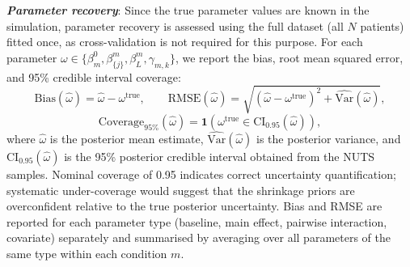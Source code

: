 \documentclass[12pt]{article}
\begin{document}
\noindent\textbf{\textit{Parameter recovery}}: Since the true parameter values are known in the simulation, parameter recovery is assessed using the full dataset (all $N$ patients) fitted once, as cross-validation is not required for this purpose. For each parameter $\omega \in \{\beta^0_m, \beta^m_{\{j\}}, \beta^m_L, \gamma_{m,k}\}$, we report the bias, root mean squared error, and 95\% credible interval coverage:
\[
\mathrm{Bias}(\hat{\omega}) = \hat{\omega} - \omega^{\mathrm{true}}, \qquad
\mathrm{RMSE}(\hat{\omega}) = \sqrt{\left(\hat{\omega} - \omega^{\mathrm{true}}\right)^2 + \widehat{\mathrm{Var}}(\hat{\omega})},
\]
\[
\mathrm{Coverage}_{95\%}(\hat{\omega}) = \mathbf{1}\!\left(\omega^{\mathrm{true}} \in \mathrm{CI}_{0.95}(\hat{\omega})\right),
\]
where $\hat{\omega}$ is the posterior mean estimate, $\widehat{\mathrm{Var}}(\hat{\omega})$ is the posterior variance, and $\mathrm{CI}_{0.95}(\hat{\omega})$ is the 95\% posterior credible interval obtained from the NUTS samples. Nominal coverage of 0.95 indicates correct uncertainty quantification; systematic under-coverage would suggest that the shrinkage priors are overconfident relative to the true posterior uncertainty. Bias and RMSE are reported for each parameter type (baseline, main effect, pairwise interaction, covariate) separately and summarised by averaging over all parameters of the same type within each condition $m$.\\
\end{document}
